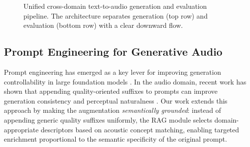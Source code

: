 \documentclass[journal]{IEEEtran}
\begin{document}
\begin{figure}[!t]
\centering
{}
\caption{Unified cross-domain text-to-audio generation and evaluation pipeline. The architecture separates generation (top row) and evaluation (bottom row) with a clear downward flow.}
\label{fig:pipeline}
\end{figure}

\subsection{Prompt Engineering for Generative Audio}

Prompt engineering has emerged as a key lever for improving generation
controllability in large foundation models \cite{brown2020gpt3}.
In the audio domain, recent work has shown that appending
quality-oriented suffixes to prompts can improve generation consistency
and perceptual naturalness \cite{huang2023makeanaudio}.
Our work extends this approach by making the augmentation
\textit{semantically grounded}: instead of appending generic quality
suffixes uniformly, the RAG module selects domain-appropriate
descriptors based on acoustic concept matching, enabling targeted
enrichment proportional to the semantic specificity of the original
prompt.
\end{document}
